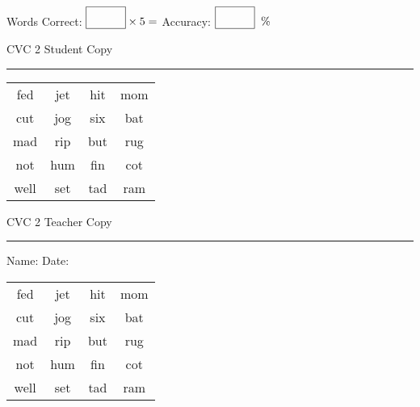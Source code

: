 \documentclass{memoir}
\begin{document}
\normalsize

Words Correct: $\fbox{\phantom{\huge 100}} \times 5 = $ Accuracy: $\fbox{\phantom{\huge 100}}\;\; \%$ 

\vfill

\newpage


\footnotesize \noindent
CVC 2 \hfill Student Copy
\smallskip
\hrule

\huge

\setlength{\tabcolsep}{14pt}
\def\arraystretch{2}

{\selectfont


\begin{vplace}[0.5]
\begin{center}
\begin{tabular}{cccc}
fed & jet & hit & mom \\
cut & jog & six & bat \\
mad & rip & but & rug \\
not & hum & fin & cot \\
well & set & tad & ram \\
\end{tabular}
\end{center}
\end{vplace}

}

\newpage

\footnotesize \noindent
CVC 2 \hfill Teacher Copy
\smallskip
\hrule

\normalsize

\vfill

\noindent
Name: \underline{\hspace{1.75in}} \hfill Date: \underline{\hspace{1in}}

\huge

{\selectfont


\begin{vplace}[0.5]
\begin{center}
\begin{tabular}{cccc}
fed & jet & hit & mom \\
cut & jog & six & bat \\
mad & rip & but & rug \\
not & hum & fin & cot \\
well & set & tad & ram \\
\end{tabular}
\end{center}
\end{vplace}



}
\end{document}
